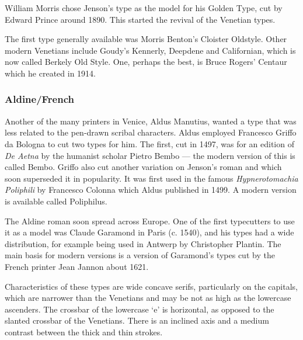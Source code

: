 \documentclass[10pt,letterpaper,extrafontsizes]{memoir}
\begin{document}
    William Morris chose Jenson's 
type as the model
for his Golden Type, cut by Edward 
Prince around 1890. This started the revival of the
Venetian types. 

    The first type generally available was Morris Benton's
Cloister Oldstyle. Other modern Venetians include 
Goudy's Kennerly, 
Deepdene and Californian, which is now
called Berkely Old Style. One, perhaps the best,
is Bruce Rogers' Centaur which he created
in 1914.


\subsubsection{Aldine/French}

    Another of the many printers in Venice, 
Aldus Manutius, wanted a type
that was less related to the pen-drawn scribal characters. Aldus employed
Francesco Griffo da Bologna to cut two types
for him.  The first, cut in 1497, was for an edition of \emph{De Aetna} 
by the humanist scholar Pietro Bembo --- the modern
version of this is called Bembo. Griffo also cut another
variation on Jenson's roman and which soon superseded it 
in popularity.
It was first used in the famous \emph{Hypnerotomachia Poliphili} by
Francesco Colonna which Aldus published in 1499.
A modern version is available called Poliphilus.

    The Aldine roman soon spread across Europe. One of the first typecutters
to use it as a model was Claude Garamond 
in Paris (c. 1540), and his types 
had a wide distribution, for example being used in Antwerp by Christopher 
Plantin. The main basis for modern versions
is a version of Garamond's types cut by the French printer 
Jean Jannon about 1621.

    Characteristics of these types are wide concave serifs, particularly
on the capitals, which are narrower than the Venetians and may be not as high
as the lowercase ascenders. The crossbar of the lowercase `e' is horizontal, 
as opposed to the slanted crossbar of the Venetians. There is an inclined axis
and a medium contrast between the thick and thin strokes.
\end{document}
